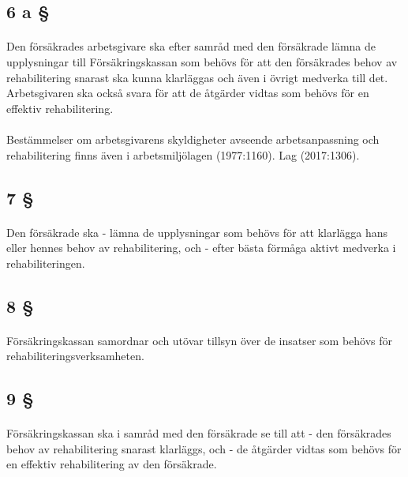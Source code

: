 \documentclass[a4paper,notitlepage,openany,10pt]{book}
\begin{document}
\subsection*{6 a §}
\paragraph*{}
Den försäkrades arbetsgivare ska efter samråd med den försäkrade lämna de upplysningar till Försäkringskassan som behövs för att den försäkrades behov av rehabilitering snarast ska kunna klarläggas och även i övrigt medverka till det. Arbetsgivaren ska också svara för att de åtgärder vidtas som behövs för en effektiv rehabilitering.
\paragraph*{}
Bestämmelser om arbetsgivarens skyldigheter avseende arbetsanpassning och rehabilitering finns även i arbetsmiljölagen (1977:1160).
Lag (2017:1306).
\subsection*{7 §}
\paragraph*{}
Den försäkrade ska
\newline - lämna de upplysningar som behövs för att klarlägga hans eller hennes behov av rehabilitering, och
\newline - efter bästa förmåga aktivt medverka i rehabiliteringen.
\subsection*{8 §}
\paragraph*{}
Försäkringskassan samordnar och utövar tillsyn över de insatser som behövs för rehabiliteringsverksamheten.
\subsection*{9 §}
\paragraph*{}
Försäkringskassan ska i samråd med den försäkrade se till att
\newline - den försäkrades behov av rehabilitering snarast klarläggs, och
\newline - de åtgärder vidtas som behövs för en effektiv rehabilitering av den försäkrade.
\end{document}
